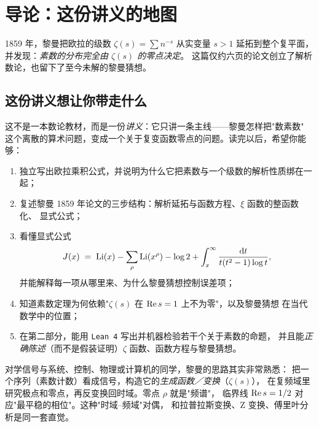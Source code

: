 \chapter{导论：这份讲义的地图}
\label{chap:intro}

\begin{keybox}[一句话概括]
1859 年，黎曼把欧拉的级数 $\zeta(s)=\sum n^{-s}$ 从实变量 $s>1$ 延拓到整个复平面，
并发现：\emph{素数的分布完全由 $\zeta(s)$ 的零点决定}。
这篇仅约六页的论文创立了解析数论，也留下了至今未解的黎曼猜想。
\end{keybox}

\section{这份讲义想让你带走什么}
\label{sec:00-goal}

这不是一本数论教材，而是一份\emph{讲义}：它只讲一条主线——黎曼怎样把"数素数"
这个离散的算术问题，变成一个关于复变函数零点的问题。读完以后，希望你能够：

\begin{enumerate}[label=\arabic*.]
  \item 独立写出欧拉乘积公式，并说明为什么它把素数与一个级数的解析性质绑在一起；
  \item 复述黎曼 1859 年论文的三步结构：解析延拓与函数方程、$\xi$ 函数的整函数化、
        显式公式；
  \item 看懂显式公式
        \begin{equation}\label{eq:00-explicit}
          J(x)\;=\;\operatorname{Li}(x)-\sum_{\rho}\operatorname{Li}(x^{\rho})-\log 2
          +\int_x^{\infty}\frac{\mathop{}\!\mathrm{d} t}{t(t^2-1)\log t},
        \end{equation}
        并能解释每一项从哪里来、为什么黎曼猜想控制误差项；
  \item 知道素数定理为何依赖"$\zeta(s)$ 在 $\operatorname{Re} s=1$ 上不为零"，以及黎曼猜想
        在当代数学中的位置；
  \item 在第二部分，能用 \texttt{Lean 4} 写出并机器检验若干个关于素数的命题，
        并且能\emph{正确陈述}（而不是假装证明）$\zeta$ 函数、函数方程与黎曼猜想。
\end{enumerate}

\begin{histbox}[为什么要给理工科学生讲这个]
对学信号与系统、控制、物理或计算机的同学，黎曼的思路其实非常熟悉：
把一个序列（素数计数）看成信号，构造它的\emph{生成函数／变换}（$\zeta(s)$），
在复频域里研究极点和零点，再反变换回时域。零点 $\rho$ 就是"频谱"，
临界线 $\operatorname{Re} s=1/2$ 对应"最平稳的相位"。这种"时域--频域"对偶，
和拉普拉斯变换、Z 变换、傅里叶分析是同一套直觉。
\end{histbox}

